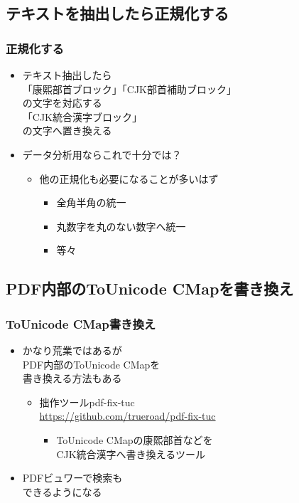\subsection{テキストを抽出したら正規化する}
\begin{frame}\frametitle{正規化する}
  \begin{itemize}
  \item テキスト抽出したら \\
    {\small 「康熙部首ブロック」「CJK部首補助ブロック」} \\
    の文字を対応する \\
    {\small 「CJK統合漢字ブロック」} \\
    の文字へ置き換える
  \item データ分析用ならこれで十分では？
    \begin{itemize}
    \item 他の正規化も必要になることが多いはず
      \begin{itemize}
      \item 全角半角の統一
      \item 丸数字を丸のない数字へ統一
      \item 等々
      \end{itemize}
    \end{itemize}
  \end{itemize}
\end{frame}

\subsection{PDF内部のToUnicode CMapを書き換え}
\begin{frame}\frametitle{ToUnicode CMap書き換え}
  \begin{itemize}
  \item かなり荒業ではあるが \\
    PDF内部のToUnicode CMapを \\
    書き換える方法もある
    \begin{itemize}
    \item 拙作ツールpdf-fix-tuc \\
      {\scriptsize \url{https://github.com/trueroad/pdf-fix-tuc}}
      \begin{itemize}
      \item ToUnicode CMapの康熙部首などを \\
        CJK統合漢字へ書き換えるツール
      \end{itemize}
    \end{itemize}
  \item PDFビュワーで検索も \\ できるようになる
  \end{itemize}
\end{frame}

